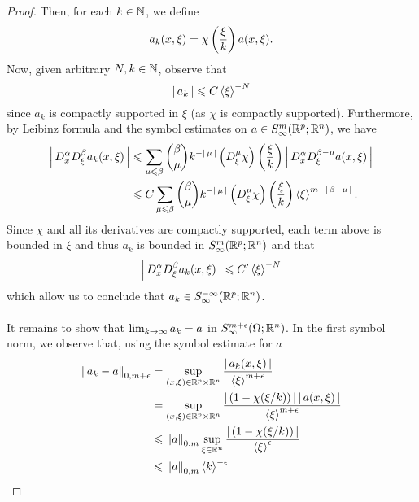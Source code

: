 \documentclass{article}
\begin{document}
\begin{proof}
    Then, for each $k \in \N$, we define
    \[
    a_k(x, \xi) = \chi\brac{\frac{\xi}{k}} a (x, \xi). 
    \]
    Now, given arbitrary $N, k \in \N$, observe that 
    \[
    \abs{a_k} \leq C \sym[\xi]^{-N} 
    \]
    since $a_k$ is compactly supported in $\xi$ (as $\chi$ is compactly supported). Furthermore, by Leibinz formula and the symbol estimates on $a \in S^{m}_\infty(\R^p; \R^n)$, we have
    \begin{align*}
    \abs{D^\alpha_x D^\beta_\xi a_k(x, \xi)} 
    & \leq \sum_{\mu \leq \beta} \binom{\beta}{\mu}k^{-\abs{\mu}} \brac{D^\mu_\xi \chi}\brac{\frac{\xi}{k}} \abs{D^\alpha_x D^{\beta - \mu}_\xi a(x, \xi) } \\
    & \leq C \sum_{\mu \leq \beta} \binom{\beta}{\mu}k^{-\abs{\mu}} \brac{D^\mu_\xi \chi}\brac{\frac{\xi}{k}} \sym[\xi]^{m - \abs{\beta - \mu}}. 
    \end{align*}
    Since $\chi$ and all its derivatives are compactly supported, each term above is bounded in $\xi$ and thus $a_k$ is bounded in $S^{m}_\infty(\R^p; \R^n)$ and that 
    \[
    \abs{D^\alpha_x D^\beta_\xi a_k(x, \xi)} \leq C' \sym[\xi]^{-N}
    \]
    which allow us to conclude that $a_k \in S^{-\infty}_\infty(\R^p; \R^n)$.\\
    \\
    It remains to show that $\Lim[k] a_k = a $ in $S^{m + \epsilon}_\infty(\Omega; \R^n)$. In the first symbol norm, we observe that, using the symbol estimate for $a$ 
    \begin{align*}
    \norm[a_k - a]_{0, m + \epsilon} 
    & = \sup_{(x, \xi) \in \R^p \times \R^n} \frac{\abs{a_k(x, \xi)}}{\sym[\xi]^{m + \epsilon}} \\
    & = \sup_{(x, \xi) \in \R^p \times \R^n} \frac{\abs{(1- \chi(\xi/k))} \abs{a(x, \xi)}}{\sym[\xi]^{m + \epsilon}} \\
    & \leq \norm[a]_{0, m} \sup_{\xi \in \R^n} \frac{\abs{(1- \chi(\xi/k))}}{\sym[\xi]^{\epsilon}} \\
    & \leq \norm[a]_{0, m} \sym[k]^{- \epsilon}\\

\end{align*}
\end{proof}
\end{document}

